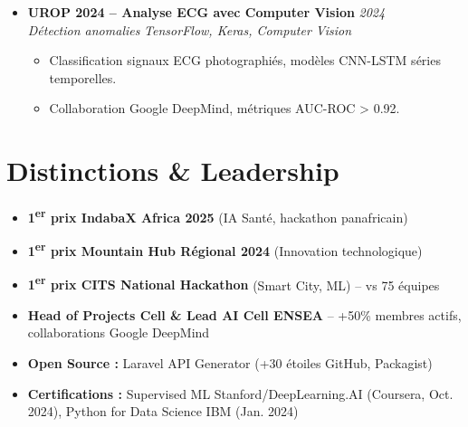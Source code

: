 \documentclass[a4paper,11pt]{article}
\begin{document}
\begin{itemize}[leftmargin=*, label={-}]
    \item \textbf{UROP 2024 -- Analyse ECG avec Computer Vision} \hfill \textit{2024} \\
    \textit{D\'etection anomalies} \hfill \textit{TensorFlow, Keras, Computer Vision}
    \vspace{-2pt}
    \begin{itemize}[leftmargin=0.4cm, nosep, label=\tiny$\bullet$]
        \item \small{Classification signaux ECG photographi\'es, mod\`eles CNN-LSTM s\'eries temporelles.}
        \item \small{Collaboration Google DeepMind, m\'etriques AUC-ROC > 0.92.}
    \end{itemize}
\end{itemize}

\section{Distinctions \& Leadership}
\begin{itemize}[leftmargin=*, label=\tiny$\bullet$, nosep]
    \item \small{\textbf{1\textsuperscript{er} prix IndabaX Africa 2025} (IA Sant\'e, hackathon panafricain)}
    \item \small{\textbf{1\textsuperscript{er} prix Mountain Hub R\'egional 2024} (Innovation technologique)}
    \item \small{\textbf{1\textsuperscript{er} prix CITS National Hackathon} (Smart City, ML) -- vs 75 \'equipes}
    \item \small{\textbf{Head of Projects Cell \& Lead AI Cell ENSEA} -- +50\% membres actifs, collaborations Google DeepMind}
    \item \small{\textbf{Open Source :} Laravel API Generator (+30 \'etoiles GitHub, Packagist)}
    \item \small{\textbf{Certifications :} Supervised ML Stanford/DeepLearning.AI (Coursera, Oct. 2024), Python for Data Science IBM (Jan. 2024)}
\end{itemize}
\end{document}
